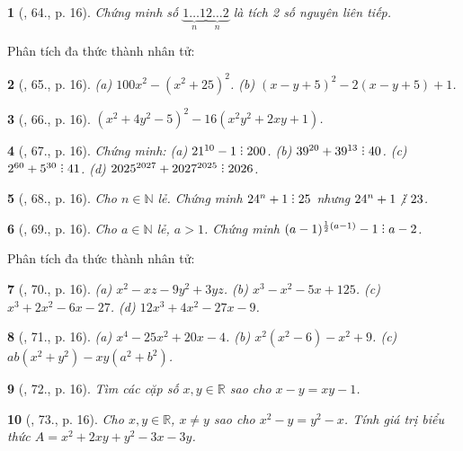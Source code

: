 \documentclass{article}
\newtheorem{baitoan}{}
\DeclareRobustCommand{\divby}{%
	\mathrel{\vbox{\baselineskip.65ex\lineskiplimit0pt\hbox{.}\hbox{.}\hbox{.}}}%
}
\begin{document}
\begin{baitoan}[\cite{Tuyen_Toan_8}, 64., p. 16]
	Chứng minh số $\underbrace{1\ldots1}_n\underbrace{2\ldots2}_n$ là tích 2 số nguyên liên tiếp.
\end{baitoan}
Phân tích đa thức thành nhân tử:

\begin{baitoan}[\cite{Tuyen_Toan_8}, 65., p. 16]
    (a) $100x^2 - (x^2 + 25)^2$. (b) $(x - y + 5)^2 - 2(x - y + 5) + 1$.
\end{baitoan}

\begin{baitoan}[\cite{Tuyen_Toan_8}, 66., p. 16]
	$(x^2 + 4y^2 - 5)^2 - 16(x^2y^2 + 2xy + 1)$.
\end{baitoan}

\begin{baitoan}[\cite{Tuyen_Toan_8}, 67., p. 16]
	Chứng minh: (a) $21^{10} - 1\divby200$. (b) $39^{20} + 39^{13}\divby40$. (c) $2^{60} + 5^{30}\divby41$. (d) $2025^{2027} + 2027^{2025}\divby2026$.
\end{baitoan}

\begin{baitoan}[\cite{Tuyen_Toan_8}, 68., p. 16]
	Cho $n\in\mathbb{N}$ lẻ. Chứng minh $24^n + 1\divby25$ nhưng $24^n + 1\not{\divby}\ 23$.
\end{baitoan}

\begin{baitoan}[\cite{Tuyen_Toan_8}, 69., p. 16]
	Cho $a\in\mathbb{N}$ lẻ, $a > 1$. Chứng minh $(a - 1)^{\frac{1}{2}(a - 1)} - 1\divby a - 2$.
\end{baitoan}
Phân tích đa thức thành nhân tử:

\begin{baitoan}[\cite{Tuyen_Toan_8}, 70., p. 16]
	(a) $x^2 - xz - 9y^2 + 3yz$. (b) $x^3 - x^2 - 5x + 125$. (c) $x^3 + 2x^2 - 6x - 27$. (d) $12x^3 + 4x^2 - 27x - 9$.
\end{baitoan}

\begin{baitoan}[\cite{Tuyen_Toan_8}, 71., p. 16]
	(a) $x^4 - 25x^2 + 20x - 4$. (b) $x^2(x^2 - 6) - x^2 + 9$. (c) $ab(x^2 + y^2) - xy(a^2 + b^2)$.
\end{baitoan}

\begin{baitoan}[\cite{Tuyen_Toan_8}, 72., p. 16]
	Tìm các cặp số $x,y\in\mathbb{R}$ sao cho $x - y = xy - 1$.
\end{baitoan}

\begin{baitoan}[\cite{Tuyen_Toan_8}, 73., p. 16]
	Cho $x,y\in\mathbb{R}$, $x\ne y$ sao cho $x^2 - y = y^2 - x$. Tính giá trị biểu thức $A = x^2 + 2xy + y^2 - 3x - 3y$.
\end{baitoan}
\end{document}
